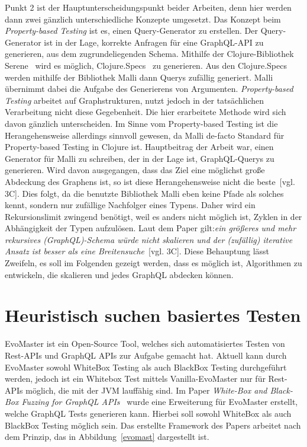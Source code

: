 Punkt 2 ist der Hauptunterscheidungspunkt beider Arbeiten, denn hier werden dann zwei gänzlich unterschiedliche Konzepte umgesetzt.
Das Konzept beim \textit{Property-based Testing} ist es, einen Query-Generator zu erstellen.
Der Query-Generator ist in der Lage, korrekte Anfragen für eine GraphQL-API zu generieren, aus dem zugrundeliegenden Schema.
Mithilfe der Clojure-Bibliothek Serene~\cite{clojureserene} wird es möglich, Clojure.Specs~\cite{clojurespec} zu generieren.
Aus den Clojure.Specs werden mithilfe der Bibliothek Malli\cite{clojuremalli} dann Querys zufällig generiert.
Malli übernimmt dabei die Aufgabe des Generierens von Argumenten.
\textit{Property-based Testing} arbeitet auf Graphstrukturen, nutzt jedoch in der tatsächlichen Verarbeitung nicht diese Gegebenheit.
Die hier erarbeitete Methode wird sich davon gänzlich unterscheiden.
Im Sinne vom Property-based Testing ist die Herangehensweise allerdings sinnvoll gewesen, da Malli\cite{clojuremalli} de-facto Standard für Property-based Testing in Clojure ist.
Hauptbeitrag der Arbeit war, einen Generator für Malli zu schreiben, der in der Lage ist, GraphQL-Querys zu generieren.
Wird davon ausgegangen, dass das Ziel eine möglichst große Abdeckung des Graphens ist, so ist diese Herangehensweise nicht die beste~\cite{property-based-testing}[vgl. 3C].
Dies folgt, da die benutzte Bibliothek Malli eben keine Pfade als solches kennt, sondern nur zufällige Nachfolger eines Typens.
Daher wird ein Rekursionslimit zwingend benötigt, weil es anders nicht möglich ist, Zyklen in der Abhängigkeit der Typen aufzulösen.
Laut dem Paper gilt:\textit{ein größeres und mehr rekursives (GraphQL)-Schema würde nicht skalieren und der (zufällig) iterative Ansatz ist besser als eine Breitensuche}~\cite{property-based-testing}[vgl. 3C].
Diese Behauptung lässt Zweifeln, es soll im Folgenden gezeigt werden, dass es möglich ist, Algorithmen zu entwickeln, die skalieren und jedes GraphQL abdecken können.

\section{Heuristisch suchen basiertes Testen}

EvoMaster\cite{evo-master} ist ein Open-Source Tool, welches sich automatisiertes Testen von Rest-APIs und GraphQL APIs zur Aufgabe gemacht hat.
Aktuell kann durch EvoMaster sowohl WhiteBox Testing als auch BlackBox Testing durchgeführt werden, jedoch ist ein
Whitebox Test mittels Vanilla-EvoMaster nur für Rest-APIs möglich, die mit der JVM lauffähig sind.
Im Paper \textit{White-Box and Black-Box Fuzzing for GraphQL APIs}~\cite{belhadi2022whitebox} wurde eine Erweiterung für EvoMaster
erstellt, welche GraphQL Tests generieren kann.
Hierbei soll sowohl WhiteBox als auch BlackBox Testing möglich sein.
Das erstellte Framework des Papers arbeitet nach dem Prinzip, das in Abbildung~\ref{evomast} dargestellt ist.

